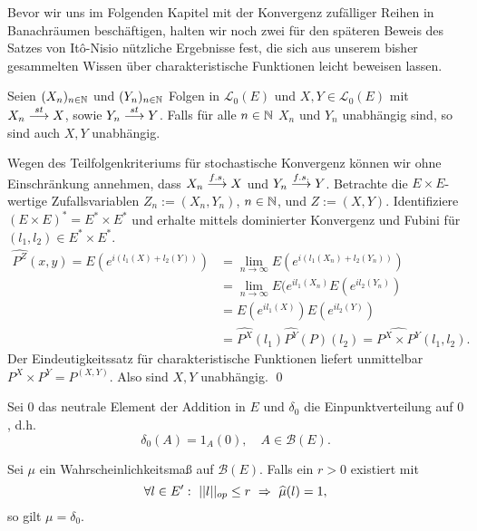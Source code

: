 Bevor wir uns im Folgenden Kapitel mit der Konvergenz zufälliger Reihen in Banachräumen beschäftigen, halten wir noch zwei für den späteren Beweis des Satzes von Itô-Nisio nützliche Ergebnisse fest, die sich aus unserem bisher gesammelten Wissen über charakteristische Funktionen leicht beweisen lassen.  

\begin{proposition}
    Seien $(X_n)_{n \in \mathbb{N}}$ und $(Y_n)_{n \in \mathbb{N}}$ Folgen in $\mathcal{L}_0(E)$ und $X,Y \in \mathcal{L}_0(E)$ mit $X_n \overset{st}{\longrightarrow} X$, sowie $Y_n \overset{st}{\longrightarrow} Y$. 
    Falls für alle $n \in \mathbb{N}$ $X_n$ und $Y_n$ unabhängig sind, so sind auch $X,Y$ unabhängig. 
\end{proposition}

\begin{proof*}%
    Wegen des Teilfolgenkriteriums für stochastische Konvergenz können wir ohne Einschränkung annehmen, dass $X_n \overset{f.s.}{\longrightarrow} X$ und $Y_n \overset{f.s.}{\longrightarrow} Y$. 
    Betrachte die $E \times E$-wertige Zufallsvariablen $Z_n:=(X_n,Y_n)$, $n \in \mathbb{N}$, und $Z:=(X,Y)$. Identifiziere $(E \times E)^* = E^* \times E^*$ und erhalte mittels dominierter Konvergenz und Fubini für $(l_1,l_2) \in E^* \times E^*$. 
    \begin{align*}
        \widehat{P^Z}(x,y) = E(e^{i(l_1(X) + l_2(Y))}) &= \lim_{n \to \infty}E(e^{i(l_1(X_n) + l_2(Y_n))})  \\\
                                                       &= \lim_{n \to \infty}E(e^{il_1(X_n)}E(e^{il_2(Y_n)}) \\\
                                                       &= E(e^{il_1(X)})E(e^{il_2(Y)})  \\\
                                                       &= \widehat{P^X}(l_1)\widehat{P^Y}(P)(l_2) = \widehat{P^X \times P^Y}(l_1, l_2).
    \end{align*}
    Der Eindeutigkeitssatz für charakteristische Funktionen liefert unmittelbar $P^X \times P^Y = P^{(X,Y)}$. Also sind $X,Y$ unabhängig. \qed
\end{proof*}

Sei $0$ das neutrale Element der Addition in $E$ und $\delta_0$ die Einpunktverteilung auf $0$, d.h. 
$$
    \delta_0(A) = 1_A(0), \quad A \in \mathcal{B}(E). 
$$

\begin{proposition}
    Sei $\mu$ ein Wahrscheinlichkeitsmaß auf $\mathcal{B}(E)$. Falls ein $r > 0$ existiert mit
    $$
       \forall l \in E': \  \lvert\lvert l \rvert\rvert_{op} \leq r \ \Rightarrow \ \widehat{\mu}(l) = 1,
    $$
    so gilt $\mu = \delta_0$. 
\end{proposition}

